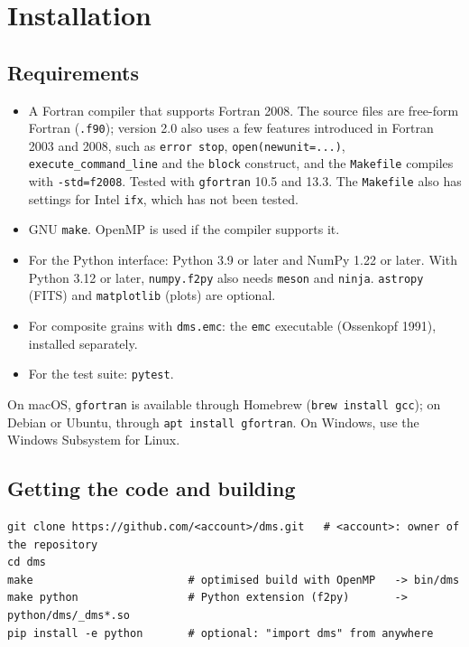 \documentclass[11pt,a4paper]{article}
\newcommand{\code}[1]{\texttt{#1}}
\begin{document}
\section{Installation}
\label{sec:install}

\subsection{Requirements}

\begin{itemize}
\item A Fortran compiler that supports Fortran 2008. The source files are free-form Fortran
      (\code{.f90}); version 2.0 also uses a few features introduced in Fortran 2003 and 2008,
      such as \code{error stop}, \code{open(newunit=...)}, \code{execute\_command\_line} and the
      \code{block} construct, and the \code{Makefile} compiles with \code{-std=f2008}. Tested with
      \code{gfortran} 10.5 and 13.3. The \code{Makefile} also has settings for Intel \code{ifx},
      which has not been tested.
\item GNU \code{make}. OpenMP is used if the compiler supports it.
\item For the Python interface: Python 3.9 or later and NumPy 1.22 or later. With Python 3.12 or
      later, \code{numpy.f2py} also needs \code{meson} and \code{ninja}. \code{astropy} (FITS) and
      \code{matplotlib} (plots) are optional.
\item For composite grains with \code{dms.emc}: the \code{emc} executable (Ossenkopf 1991),
      installed separately.
\item For the test suite: \code{pytest}.
\end{itemize}

On macOS, \code{gfortran} is available through Homebrew (\code{brew install gcc}); on Debian or
Ubuntu, through \code{apt install gfortran}. On Windows, use the Windows Subsystem for Linux.

\subsection{Getting the code and building}

\begin{lstlisting}[style=sh]
git clone https://github.com/<account>/dms.git   # <account>: owner of the repository
cd dms
make                        # optimised build with OpenMP   -> bin/dms
make python                 # Python extension (f2py)       -> python/dms/_dms*.so
pip install -e python       # optional: "import dms" from anywhere
\end{lstlisting}
\end{document}
